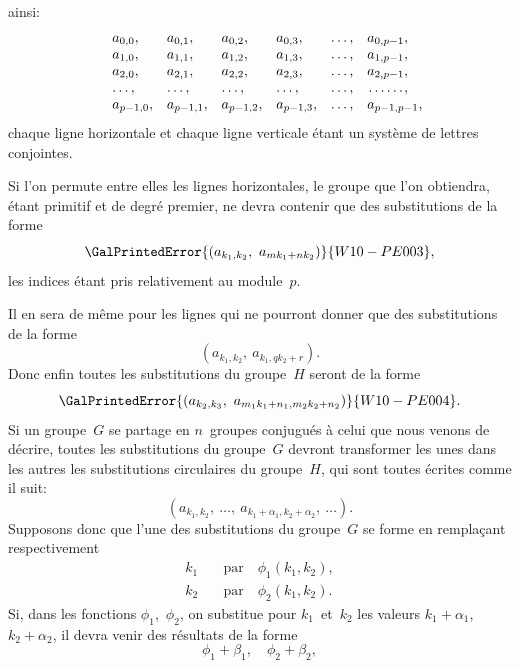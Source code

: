 ainsi:
\[
\begin{array}{*{6}{l}}
  a_{0,0}, & a_{0,1}, & a_{0,2}, & a_{0,3}, & \dots, & a_{0,p-1},\\
  a_{1,0}, & a_{1,1}, & a_{1,2}, & a_{1,3}, & \dots, & a_{1,p-1},\\
  a_{2,0}, & a_{2,1}, & a_{2,2}, & a_{2,3}, & \dots, & a_{2,p-1},\\
  \dots,  & \dots,  & \dots,  & \dots,  & \dots, & \dotfill, \\
  a_{p-1,0}, & a_{p-1,1}, & a_{p-1,2}, & a_{p-1,3}, & \dots, & \rlap{$a_{p-1,p-1},$}
\end{array}
\]
chaque ligne horizontale et chaque ligne verticale étant un système
de lettres conjointes.

Si l'on permute entre elles les lignes horizontales, le groupe
que l'on obtiendra, étant primitif et de degré premier, ne devra
contenir que des substitutions de la forme
\[
\GalPrintedError{(a_{k_{1},k_{2}},\ a_{mk_{1}+n k_{2}})}{W10-PE003},
\]
les indices étant pris relativement au module~$p$.

Il en sera de même pour les lignes qui ne pourront donner que
des substitutions de la forme
\[
(a_{k_{1},k_{2}},\ a_{k_{1}, qk_{2}+r}).
\]
Donc enfin toutes les substitutions du groupe~$H$ seront de la
forme
\[
\GalPrintedError{(a_{k_{2},k_{3}},\ a_{m_{1} k_{1}+n_{1}, m_{2} k_{2}+n_{2}})}{W10-PE004}.
\]
Si un groupe~$G$ se partage en $n$~groupes conjugués à celui que
nous venons de décrire, toutes les substitutions du groupe~$G$ devront
transformer les unes dans les autres les substitutions circulaires
du groupe~$H$, qui sont toutes écrites comme il suit:
\[
\tag{a}
(a_{k_{1},k_{2}},\ \dots,\ a_{k_{1}+\alpha_{1}, k_{2}+\alpha_{2}},\ \dots).
\]
Supposons donc que l'une des substitutions du groupe~$G$ se forme
en remplaçant respectivement
\begin{align*}
k_{1} & \quad\text{par}\quad \phi_{1} (k_{1}, k_{2}),\\
k_{2} & \quad\text{par}\quad \phi_{2} (k_{1}, k_{2}).
\end{align*}
Si, dans les fonctions $\phi_{1}$,~$\phi_{2}$, on substitue pour $k_{1}$~et~$k_{2}$ les valeurs
$k_{1} + \alpha_{1}$, $k_{2} + \alpha_{2}$, il devra venir des résultats de la forme
\[
\phi_{1} + \beta_{1},\quad \phi_{2} + \beta_{2},
\]
